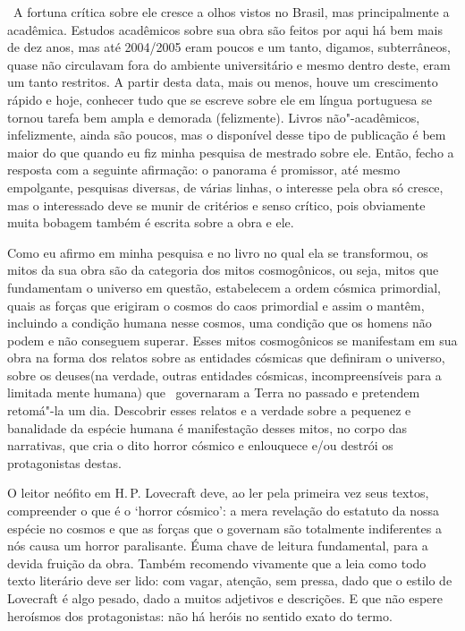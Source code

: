 \begin{changemargin}
 A fortuna crítica sobre ele cresce a olhos vistos no Brasil, mas principalmente a acadêmica. Estudos acadêmicos sobre sua obra são feitos por aqui há bem mais de dez anos, mas até 2004/2005 eram poucos e um tanto, digamos, subterrâneos, quase não circulavam fora do ambiente universitário e mesmo dentro deste, eram um tanto restritos. A partir desta data, mais ou menos, houve um crescimento rápido e hoje, conhecer tudo que se escreve sobre ele em língua portuguesa se tornou tarefa bem ampla e demorada (felizmente). Livros não"-acadêmicos, infelizmente, ainda são poucos, mas o {} disponível desse tipo de publicação é bem maior do que quando eu fiz minha pesquisa de mestrado sobre ele. Então, fecho a resposta com a seguinte afirmação: o panorama é promissor, até mesmo empolgante, pesquisas diversas, de várias linhas, o interesse pela obra só cresce, mas o interessado deve se munir de critérios e senso crítico, pois obviamente muita bobagem também é escrita sobre a obra e ele.

\bigskip
\pagebreak	


Como eu afirmo em minha pesquisa e no livro no qual ela se transformou, os mitos da sua obra são da categoria dos mitos cosmogônicos, ou seja, mitos que fundamentam o universo em questão, estabelecem a ordem cósmica primordial, quais as forças que erigiram o cosmos do caos primordial e assim o mantêm, incluindo a condição humana nesse cosmos, uma condição que os homens não podem e não conseguem superar. Esses mitos cosmogônicos se manifestam em sua obra na forma dos relatos sobre as entidades cósmicas que definiram o universo, sobre os deuses(na verdade, outras entidades cósmicas, incompreensíveis para a limitada mente humana) que  governaram a Terra no passado e pretendem retomá"-la um dia. Descobrir esses relatos e a verdade sobre a pequenez e banalidade da espécie humana é manifestação desses mitos, no corpo das narrativas, que cria o dito horror cósmico e enlouquece e/ou destrói os protagonistas destas.

\bigskip


O leitor neófito em H.\,P. Lovecraft deve, ao ler pela primeira vez seus textos, compreender o que é o `horror cósmico': a mera revelação do estatuto da nossa espécie no cosmos e que as forças que o governam são totalmente indiferentes a nós causa um horror paralisante. Éuma chave de leitura fundamental, para a devida fruição da obra. Também recomendo vivamente que a leia como todo texto literário deve ser lido: com vagar, atenção, sem pressa, dado que o estilo de Lovecraft é algo pesado, dado a muitos adjetivos e descrições. E que não espere heroísmos dos protagonistas: não há heróis no sentido exato do termo.


\end{changemargin}
